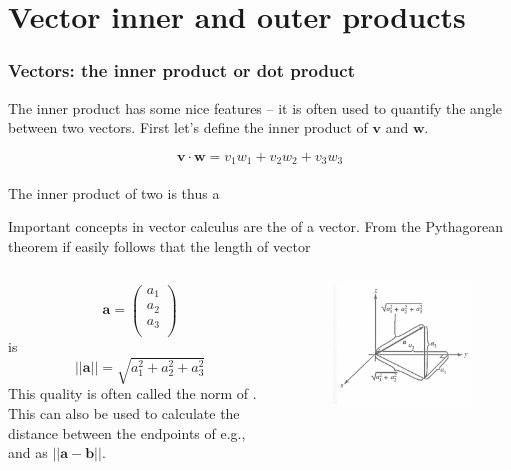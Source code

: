 \documentclass{beamer}
\begin{document}
\section{Vector inner and outer products}
\begin{frame}
\frametitle{Vectors: the inner product or dot product}
The inner product has some nice features -- it is often used to quantify the angle between two vectors. First let's define the inner product of $\mathbf{v}$ and $\mathbf{w}$.


$$ \mathbf{v} \cdot \mathbf{w} = v_1w_1 + v_2w_2 + v_3w_3$$\\[1cm]
The inner product of two  {} is thus a  {}

\end{frame}
\begin{frame}
Important concepts in vector calculus are the  of a vector. From the Pythagorean theorem if easily follows that the length of vector
\begin{columns}[c]

	$$\mathbf{a} = \left(
		\begin{array}{c}
		a_1\\
		a_2\\
		a_3\\
		\end{array}
	\right)$$
is $$|| \mathbf{a}  || = \sqrt{a_{1}^{2} + a_{2}^{2} + a_{3}^{2} }$$
This quality is often called the norm of  . This can also be used to calculate the distance between the endpoints of e.g.,  and  as $||\mathbf{a}-\mathbf{b}||$.    

\begin{figure}[htbp]
\begin{center}
\includegraphics[width=1.1\textwidth]{fig_pyth.png}
\end{center}
\end{figure}

\end{columns}

\end{frame}
\end{document}
